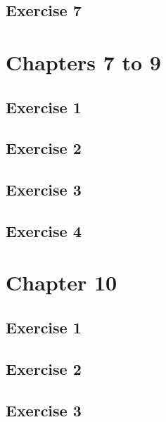 \documentclass[a4paper,12pt,oneside]{book}
\begin{document}
\hypertarget{exercise-7}{%
\subsection{Exercise 7}\label{exercise-7}}

\hypertarget{chapters-7-to-9}{%
\section{Chapters 7 to 9}\label{chapters-7-to-9}}

\hypertarget{exercise-1-4}{%
\subsection{Exercise 1}\label{exercise-1-4}}

\hypertarget{exercise-2-4}{%
\subsection{Exercise 2}\label{exercise-2-4}}

\hypertarget{exercise-3-4}{%
\subsection{Exercise 3}\label{exercise-3-4}}

\hypertarget{exercise-4-3}{%
\subsection{Exercise 4}\label{exercise-4-3}}

\hypertarget{chapter-10}{%
\section{Chapter 10}\label{chapter-10}}

\hypertarget{exercise-1-5}{%
\subsection{Exercise 1}\label{exercise-1-5}}

\hypertarget{exercise-2-5}{%
\subsection{Exercise 2}\label{exercise-2-5}}

\hypertarget{exercise-3-5}{%
\subsection{Exercise 3}\label{exercise-3-5}}
\end{document}
